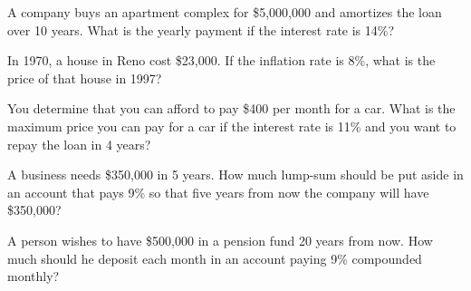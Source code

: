 \begin{puzzle}
    A company buys an apartment complex for \$5,000,000 and amortizes the loan over 10 years. What is the yearly payment if the interest rate is 14\%?
\end{puzzle}

\begin{puzzle}{10.85}
    In 1970, a house in Reno cost \$23,000. If the inflation rate is 8\%, what is the price of that house in 1997?
    \end{puzzle}
    
    \begin{puzzle}{10.86}
    You determine that you can afford to pay \$400 per month for a car. What is the maximum price you can pay for a car if the interest rate is 11\% and you want to repay the loan in 4 years?
    \end{puzzle}
    
    \begin{puzzle}{10.87}
    A business needs \$350,000 in 5 years. How much lump-sum should be put aside in an account that pays 9\% so that five years from now the company will have \$350,000?
    \end{puzzle}
    
    \begin{puzzle}{10.88}
    A person wishes to have \$500,000 in a pension fund 20 years from now. How much should he deposit each month in an account paying 9\% compounded monthly?
    \end{puzzle}